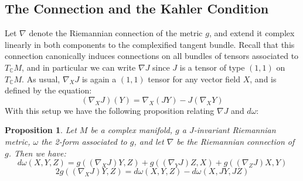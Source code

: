 \documentclass[11pt]{amsart}
\newtheorem{prop}[subsection]{Proposition}
\theoremstyle{definition}
\def \C{ \mathbb{C} }
\begin{document}
\subsection{ The Connection and the Kahler Condition}

Let $\nabla$ denote the Riemannian connection of the metric $g$, and extend it complex linearly in both components to the complexified tangent bundle.  Recall that this connection canonically induces connections on all bundles of tensors associated to $T_{\C}M$, and in particular we can write $\nabla J$ since $J$ is a tensor of type $(1,1)$ on $T_{\C}M$.  As usual, $\nabla_X J$ is again a $(1,1)$ tensor for any vector field $X$, and is defined by the equation:
%
$$ ( \nabla_X J )(Y) = \nabla_X( JY ) - J( \nabla_X Y ) $$
%
With this setup we have the following proposition relating $\nabla J$ and $d \omega$:
%
\begin{prop} Let $M$ be a complex manifold, $g$ a $J$-invariant Riemannian metric, $\omega$ the 2-form associated to $g$, and let $\nabla$ be the Riemannian connection of $g$.  Then we have:
%
$$ d \omega( X, Y, Z ) = g( (\nabla_X J)Y, Z) + g( (\nabla_Y J)Z, X ) + g( (\nabla_Z J)X, Y ) $$
$$ 2 g( (\nabla_X J)Y, Z ) = d \omega(X, Y, Z) - d \omega(X, JY, JZ) $$
%
\end{prop}
%
\end{document}
